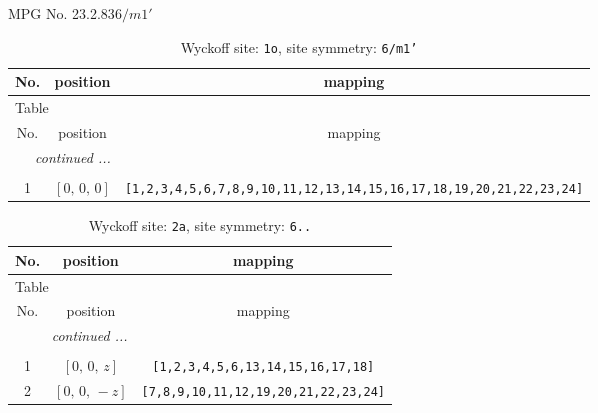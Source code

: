 \documentclass[fleqn,8pt]{jsarticle}
\begin{document}
\setcounter{MaxMatrixCols}{32}

\renewcommand{\tablename}{Table~}
\renewcommand{\figurename}{Figure~}
\begin{center}
\LARGE
MPG No. 23.2.83\quad$6/m1'$
\end{center}
\renewcommand{\arraystretch}{1.2}
\begin{longtable}{ccc}
\caption{Wyckoff site: {\tt 1o}, site symmetry: {\tt 6/m1'}}
 \\
 \hline \hline
No. & position & mapping \\ \hline \endfirsthead

\multicolumn{2}{l}{\tablename\ \thetable{}} \\
 \hline \hline
No. & position & mapping \\ \hline \endhead

 \hline \hline
\multicolumn{2}{r}{\footnotesize\it continued ...} \\ \endfoot

 \hline \hline
\multicolumn{2}{r}{} \\ \endlastfoot

1 & $\left[ 0,\, 0,\, 0 \right]$ & {\tt [1,2,3,4,5,6,7,8,9,10,11,12,13,14,15,16,17,18,19,20,21,22,23,24]} \\
\end{longtable}
\renewcommand{\arraystretch}{1.2}
\begin{longtable}{ccc}
\caption{Wyckoff site: {\tt 2a}, site symmetry: {\tt 6..}}
 \\
 \hline \hline
No. & position & mapping \\ \hline \endfirsthead

\multicolumn{2}{l}{\tablename\ \thetable{}} \\
 \hline \hline
No. & position & mapping \\ \hline \endhead

 \hline \hline
\multicolumn{2}{r}{\footnotesize\it continued ...} \\ \endfoot

 \hline \hline
\multicolumn{2}{r}{} \\ \endlastfoot

1 & $\left[ 0,\, 0,\, z \right]$ & {\tt [1,2,3,4,5,6,13,14,15,16,17,18]} \\ \hline
2 & $\left[ 0,\, 0,\, - z \right]$ & {\tt [7,8,9,10,11,12,19,20,21,22,23,24]} \\
\end{longtable}
\renewcommand{\arraystretch}{1.2}
\end{document}
